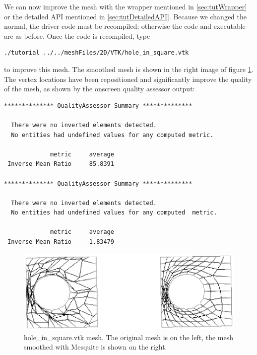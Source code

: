 We can now improve the mesh with the wrapper mentioned in
\ref{sec:tutWrapper} or the detailed API mentioned in
\ref{sec:tutDetailedAPI}. 
Because we changed the normal, the driver code must be recompiled;
otherwise the code and executable are as before.
Once the code is recompiled, type 
\begin{verbatim}
./tutorial ../../meshFiles/2D/VTK/hole_in_square.vtk
\end{verbatim}
to improve this mesh.
The smoothed mesh is shown in the right image of figure
\ref{fig:hole}.
The vertex locations have been repositioned and significantly improve
the quality of the mesh, as shown by the onscreen
quality assessor output:  
\begin{verbatim}
************** QualityAssessor Summary **************

  There were no inverted elements detected. 
  No entities had undefined values for any computed metric.

             metric     average
 Inverse Mean Ratio     85.8391

************** QualityAssessor Summary **************

  There were no inverted elements detected. 
  No entities had undefined values for any computed  metric.

             metric     average
 Inverse Mean Ratio     1.83479

\end{verbatim}
\begin{figure}[htbp]
\begin{center}
    \includegraphics{hole_in_square.ps}
    \caption{hole\_in\_square.vtk mesh. The original mesh is on the left, the mesh smoothed with
    Mesquite is shown on the right.}
    \label{fig:hole}
\end{center}
\end{figure}
